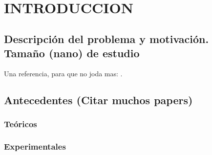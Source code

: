 
\chapter{INTRODUCCION} %

\label{C1} %



\section{Descripción del problema y motivación. Tamaño (nano) de estudio}
\label{S1_1}

\Large{Una referencia, para que no joda mas: } \citep{zberg09}.\\


\section{Antecedentes (Citar muchos papers)}
\label{S1_2}


\subsection{Teóricos}
\label{S1_2_1}


\subsection{Experimentales}
\label{S1_2_2}


